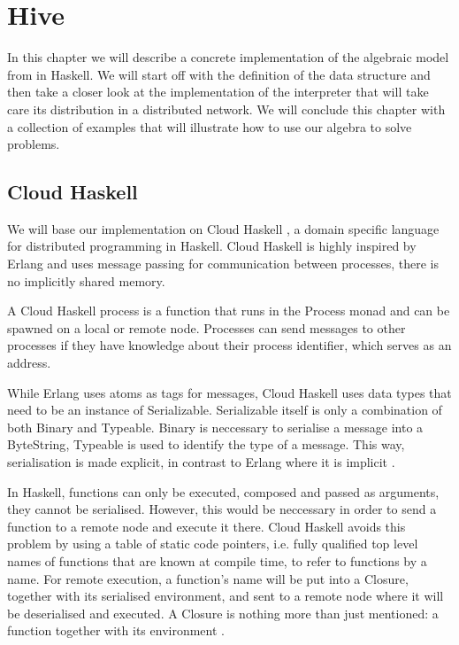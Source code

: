 \chapter{Hive}
In this chapter we will describe a concrete implementation of the algebraic model from  in Haskell. We will start off with the definition of the data structure and then take a closer look at the implementation of the interpreter that will take care its distribution in a distributed network. We will conclude this chapter with a collection of examples that will illustrate how to use our algebra to solve problems.

\section{Cloud Haskell}
We will base our implementation on Cloud Haskell \cite{Epstein:2011:THC:2034675.2034690}, a domain specific language for distributed programming in Haskell. Cloud Haskell is highly inspired by Erlang and uses message passing for communication between processes, there is no implicitly shared memory.

A Cloud Haskell process is a function that runs in the \textsf{Process} monad and can be spawned on a local or remote node. Processes can send messages to other processes if they have knowledge about their process identifier, which serves as an address.

While Erlang uses atoms as tags for messages, Cloud Haskell uses data types that need to be an instance of \textsf{Serializable}. \textsf{Serializable} itself is only a combination of both \textsf{Binary} and \textsf{Typeable}. \textsf{Binary} is neccessary to serialise a message into a \textsf{ByteString}, \textsf{Typeable} is used to identify the type of a message. This way, serialisation is made explicit, in contrast to Erlang where it is implicit \cite{Epstein:2011:THC:2034675.2034690}.

In Haskell, functions can only be executed, composed and passed as arguments, they cannot be serialised. However, this would be neccessary in order to send a function to a remote node and execute it there. Cloud Haskell avoids this problem by using a table of static code pointers, i.e. fully qualified top level names of functions that are known at compile time, to refer to functions by a name. For remote execution, a function's name will be put into a \textsf{Closure}, together with its serialised environment, and sent to a remote node where it will be deserialised and executed. A \textsf{Closure} is nothing more than just mentioned: a function together with its environment \cite{Epstein:2011:THC:2034675.2034690}.

